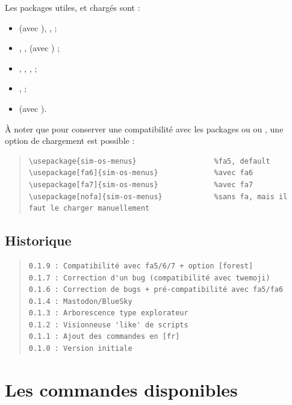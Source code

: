 \documentclass[11pt,a4paper]{ltxdoc}
\begin{document}
Les packages utiles, et chargés sont :

\begin{itemize}
	\item {} (avec ), ,  ;
	\item {}, ,  (avec ) ;
	\item {}, , ,  ;
	\item {},  ;
	\item {} (avec ).
\end{itemize}

À noter que pour conserver une compatibilité avec les packages  ou  ou , une option de chargement est possible :

\begin{quote}
\begin{verbatim}
\usepackage{sim-os-menus}                  %fa5, default
\usepackage[fa6]{sim-os-menus}             %avec fa6
\usepackage[fa7]{sim-os-menus}             %avec fa7
\usepackage[nofa]{sim-os-menus}            %sans fa, mais il faut le charger manuellement
\end{verbatim}
\end{quote}

\vfill

\subsection{Historique}

\begin{quote}
\begin{verbatim}
0.1.9 : Compatibilité avec fa5/6/7 + option [forest]
0.1.7 : Correction d'un bug (compatibilité avec twemoji)
0.1.6 : Correction de bugs + pré-compatibilité avec fa5/fa6
0.1.4 : Mastodon/BlueSky
0.1.3 : Arborescence type explorateur
0.1.2 : Visionneuse 'like' de scripts
0.1.1 : Ajout des commandes en [fr]
0.1.0 : Version initiale
\end{verbatim}
\end{quote}

\pagebreak

\section{Les commandes disponibles}
\end{document}
